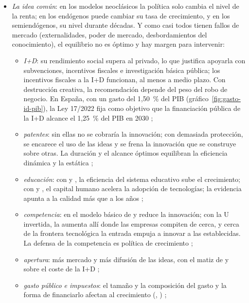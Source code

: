 \documentclass[11pt]{article}
\begin{document}
\begin{itemize}
\item \emph{La idea común}: en los modelos neoclásicos la política solo cambia el nivel de la renta; en los endógenos puede cambiar su tasa de crecimiento, y en los semiendógenos, su nivel durante décadas. Y como casi todos tienen fallos de mercado (externalidades, poder de mercado, desbordamientos del conocimiento), el equilibrio no es óptimo y hay margen para intervenir:
  \begin{itemize}
  \item \emph{I+D}: su rendimiento social supera al privado\nocite{JonesWilliams1998Measuring}, lo que justifica apoyarla con subvenciones, incentivos fiscales e investigación básica pública; los incentivos fiscales a la I+D funcionan, al menos a medio plazo\nocite{BloomVanReenenWilliams2019Toolkit}. Con destrucción creativa, la recomendación depende del peso del robo de negocio. En España, con un gasto del 1,50~\% del PIB (gráfico~\ref{fig:gasto-id-pib}), la Ley 17/2022 fija como objetivo que la financiación pública de la I+D alcance el 1,25~\% del PIB en 2030\nocite{BOE2022Ley17} ;
  \item \emph{patentes}: sin ellas no se cobraría la innovación; con demasiada protección, se encarece el uso de las ideas y se frena la innovación que se construye sobre otras. La duración y el alcance óptimos equilibran la eficiencia dinámica y la estática\nocite{Nordhaus1969Invention} ;
  \item \emph{educación}: con  y , la eficiencia del sistema educativo sube el crecimiento; con  y , el capital humano acelera la adopción de tecnologías; la evidencia apunta a la calidad más que a los años ;
  \item \emph{competencia}: en el modelo básico de  y  reduce la innovación; con la U invertida, la aumenta allí donde las empresas compiten de cerca, y cerca de la frontera tecnológica la entrada empuja a innovar a las establecidas. La defensa de la competencia es política de crecimiento ;
  \item \emph{apertura}: más mercado y más difusión de las ideas, con el matiz de  y  sobre el coste de la I+D ;
  \item \emph{gasto público e impuestos}: el tamaño y la composición del gasto y la forma de financiarlo afectan al crecimiento (, ) ;

\end{itemize}
\end{itemize}
\end{document}
